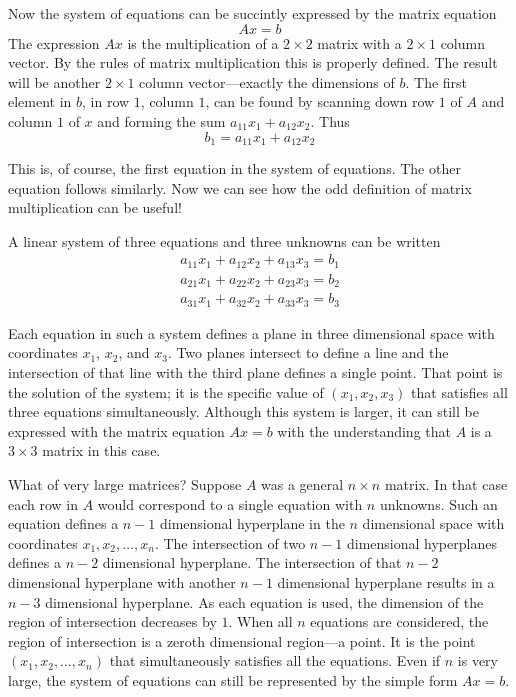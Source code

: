 Now the system of equations can be succintly expressed by the matrix equation
\begin{displaymath}
Ax = b
\end{displaymath}
The expression $Ax$ is the multiplication of a $2 \times 2$ matrix with a $2 \times 1$ column
vector. By the rules of matrix multiplication this is properly defined. The result will be
another $2 \times 1$ column vector---exactly the dimensions of $b$. The first element in $b$, in
row $1$, column $1$, can be found by scanning down row $1$ of $A$ and column $1$ of $x$ and
forming the sum $a_{11}x_1 + a_{12}x_2$. Thus
\begin{displaymath}
b_1 = a_{11}x_1 + a_{12}x_2
\end{displaymath}

This is, of course, the first equation in the system of equations. The other equation follows
similarly. Now we can see how the odd definition of matrix multiplication can be useful!

A linear system of three equations and three unknowns can be written
\begin{eqnarray*}
a_{11}x_1 + a_{12}x_2 + a_{13}x_3 = b_1 \\
a_{21}x_1 + a_{22}x_2 + a_{23}x_3 = b_2 \\
a_{31}x_1 + a_{32}x_2 + a_{33}x_3 = b_3
\end{eqnarray*}

Each equation in such a system defines a plane in three dimensional space with coordinates
$x_1$, $x_2$, and $x_3$. Two planes intersect to define a line and the intersection of that line
with the third plane defines a single point. That point is the solution of the system; it is the
specific value of $(x_1, x_2, x_3)$ that satisfies all three equations simultaneously. Although
this system is larger, it can still be expressed with the matrix equation $Ax = b$ with the
understanding that $A$ is a $3 \times 3$ matrix in this case.

What of very large matrices? Suppose $A$ was a general $n \times n$ matrix. In that case each
row in $A$ would correspond to a single equation with $n$ unknowns. Such an equation defines a
$n-1$ dimensional hyperplane in the $n$ dimensional space with coordinates $x_1, x_2, \ldots,
x_n$. The intersection of two $n-1$ dimensional hyperplanes defines a $n-2$ dimensional
hyperplane. The intersection of that $n-2$ dimensional hyperplane with another $n-1$ dimensional
hyperplane results in a $n-3$ dimensional hyperplane. As each equation is used, the dimension of
the region of intersection decreases by $1$. When all $n$ equations are considered, the region
of intersection is a zeroth dimensional region---a point. It is the point $(x_1, x_2, \ldots,
x_n)$ that simultaneously satisfies all the equations. Even if $n$ is very large, the system of
equations can still be represented by the simple form $Ax = b$.

